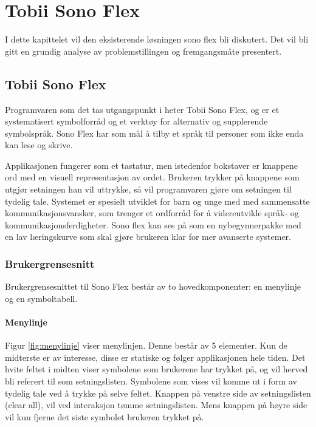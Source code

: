 

\chapter{Tobii Sono Flex}
I dette kapittelet vil den eksisterende løsningen sono flex bli diskutert. Det vil bli gitt en grundig analyse av problemstillingen og fremgangsmåte presentert.

\section{Tobii Sono Flex}
\label{chap:Tobii-Sono-Flex}

Programvaren som det tas utgangspunkt i heter Tobii Sono Flex,  og er et systematisert symbolforråd og et verktøy for alternativ og supplerende symbolspråk. Sono Flex har som mål å tilby et språk til personer som ikke enda kan lese og skrive. 

Applikasjonen fungerer som et tastatur, men istedenfor bokstaver er knappene ord med en visuell representasjon av ordet. Brukeren trykker på knappene som utgjør setningen han vil uttrykke, så vil programvaren gjøre om setningen til tydelig tale.  Systemet er spesielt utviklet for barn og unge med med sammensatte kommunikasjonsvansker, som trenger et ordforråd for å videreutvikle språk- og kommunikasjonsferdigheter. Sono flex kan ses på som en nybegynnerpakke med en lav læringskurve som skal gjøre brukeren klar for mer avanserte systemer. 


\subsection{Brukergrensesnitt}

Brukergrensesnittet til Sono Flex består av to hovedkomponenter: en menylinje og en symboltabell. 


\subsubsection{Menylinje}

Figur \ref{fig:menylinje} viser menylinjen.  Denne består av 5 elementer.  Kun de midterste er av interesse, disse  er statiske og følger applikasjonen hele tiden. Det hvite feltet i midten viser symbolene som brukerene har trykket på, og vil herved bli referert til som setningslisten. Symbolene som vises vil komme ut i form av tydelig tale ved å trykke på selve feltet. Knappen på venstre side av setningslisten (clear all), vil ved interaksjon tømme setningslisten. Mens knappen på høyre side vil kun fjerne det siste symbolet brukeren trykket på.


